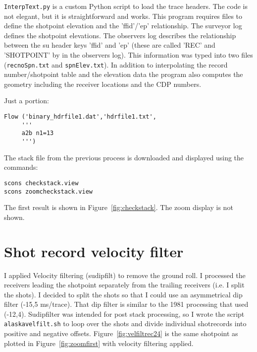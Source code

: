 \texttt{InterpText.py} is a custom Python script to load the trace headers.  The
code is not elegant, but it is straightforward and works.  This program 
requires files to define the shotpoint elevation and the 'ffid'/'ep' 
relationship.  The surveyor log defines the shotpoint elevations.  The 
observers log describes the relationship between the su header keys 
'ffid' and 'ep' (these are called 'REC' and 'SHOTPOINT' by in the observers 
log).  This information was typed into two files (\texttt{recnoSpn.txt} and 
\texttt{spnElev.txt}).  In addition to interpolating the record number/shotpoint 
table and the elevation data the program also computes the geometry 
including the receiver locations and the CDP numbers.

\lstset{language=python,numbers=left,numberstyle=\tiny,showstringspaces=false}


Just a portion:



\begin{lstlisting}
Flow ('binary_hdrfile1.dat','hdrfile1.txt',
     ''' 
     a2b n1=13
     ''')
\end{lstlisting}

The stack file from the previous process is downloaded and displayed 
using the commands: 
\begin{verbatim}
scons checkstack.view 
scons zoomcheckstack.view
\end{verbatim}

The first result is shown in Figure~\ref{fig:checkstack}.  The zoom display
is not shown.


\section{Shot record velocity filter}
I applied Velocity filtering (sudipfilt) to remove the ground roll.  I
processed the receivers leading the shotpoint separately from the
trailing receivers (i.e. I split the shots).  I decided to split the
shots so that I could use an asymmetrical dip filter (-15,5 ms/trace).
That dip filter is similar to the 1981 processing that used
(-12,4). Sudipfilter was intended for post stack processing, so I
wrote the script \texttt{alaskavelfilt.sh} to loop over the shots and
divide individual shotrecords into positive and negative offsets.
Figure~\ref{fig:velfiltrec24} is the same shotpoint as plotted in
Figure~\ref{fig:zoomfirst} with velocity filtering applied.

